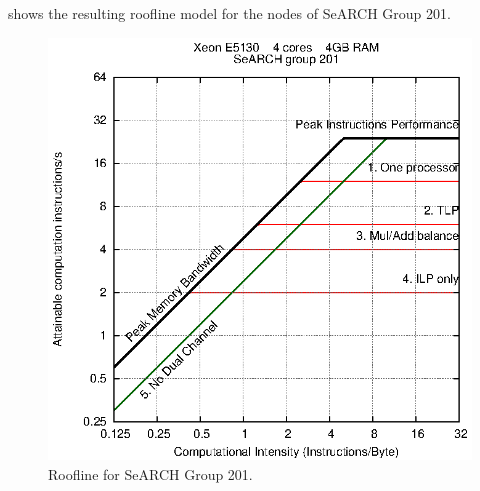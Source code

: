 \documentclass[abstract=on,9pt,twocolumn]{scrartcl}
\begin{document}
 shows the resulting roofline model for the nodes of SeARCH Group 201.

\begin{figure}[!htp]
	\begin{center}
		\includegraphics[width=\columnwidth]{images/report.april/roofline.eps}
	\end{center}
	\caption{Roofline for SeARCH Group 201.}
	\label{fig:roofline}
\end{figure}
\end{document}
